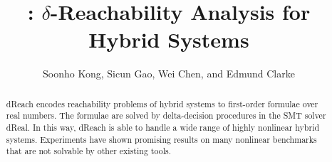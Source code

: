 \documentclass{llncs}
\title{\dReach{}: $\delta$-Reachability Analysis for Hybrid Systems}
\newcommand{\dReal}{\textsf{dReal}}
\newcommand{\dReach}{\textsf{dReach}}
\begin{document}
\mainmatter  %

\author{Soonho Kong, Sicun Gao, Wei Chen, and Edmund Clarke}
\maketitle

\begin{abstract}
  \dReach{} encodes reachability problems of hybrid systems to
  first-order formulae over real numbers. The formulae are solved by
  delta-decision procedures in the SMT solver \dReal{}. In this way,
  \dReach{} is able to handle a wide range of highly nonlinear hybrid
  systems. Experiments have shown promising results on many nonlinear
  benchmarks that are not solvable by other existing tools.
\end{abstract}











\end{document}
